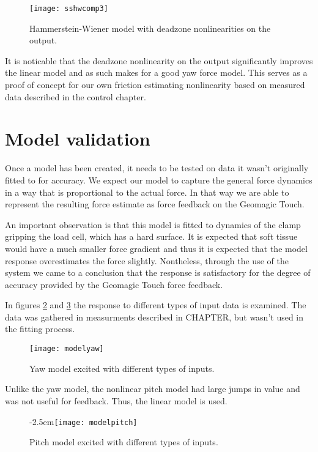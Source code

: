\begin{figure}[H]
\centering
\hspace{-2.5em}\texttt{[image: sshwcomp3]}
\caption{Hammerstein-Wiener model with deadzone nonlinearities on the output.}
\label{fig:2LMI2}
\end{figure}

It is noticable that the deadzone nonlinearity on the output significantly improves the linear model and as such makes for a good yaw force model.
This serves as a proof of concept for our own friction estimating nonlinearity based on measured data described in the control chapter.

\section{Model validation} \label{se:mdval}
Once a model has been created, it needs to be tested on data it wasn't originally fitted to for accuracy.
We expect our model to capture the general force dynamics in a way that is proportional to the actual force.
In that way we are able to represent the resulting force estimate as force feedback on the Geomagic Touch.

An important observation is that this model is fitted to dynamics of the clamp gripping the load cell, which has a hard surface.
It is expected that soft tissue would have a much smaller force gradient and thus it is expected that the model response overestimates the force slightly.
Nontheless, through the use of the system we came to a conclusion that the response is satisfactory for the degree of accuracy provided by the Geomagic Touch force feedback.

In figures \ref{fig:final_res_yaw} and \ref{fig:final_res_pitch} the response to different types of input data is examined.
The data was gathered in measurments described in CHAPTER, but wasn't used in the fitting process.


\begin{figure}[H]
\hspace{-2.5em}\texttt{[image: modelyaw]}
\caption{Yaw model excited with different types of inputs.}
\label{fig:final_res_yaw}
\end{figure}

Unlike the yaw model, the nonlinear pitch model had large jumps in value and was not useful for feedback.
Thus, the linear model is used.

\begin{figure}[H]
{-2.5em}\texttt{[image: modelpitch]}
\caption{Pitch model excited with different types of inputs.}
\label{fig:final_res_pitch}
\end{figure}

